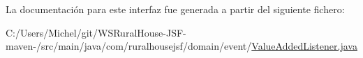 La documentación para este interfaz fue generada a partir del siguiente fichero\+:\begin{DoxyCompactItemize}
\item 
C\+:/\+Users/\+Michel/git/\+W\+S\+Rural\+House-\/\+J\+S\+F-\/maven-\//src/main/java/com/ruralhousejsf/domain/event/\mbox{\hyperlink{_value_added_listener_8java}{Value\+Added\+Listener.\+java}}\end{DoxyCompactItemize}
